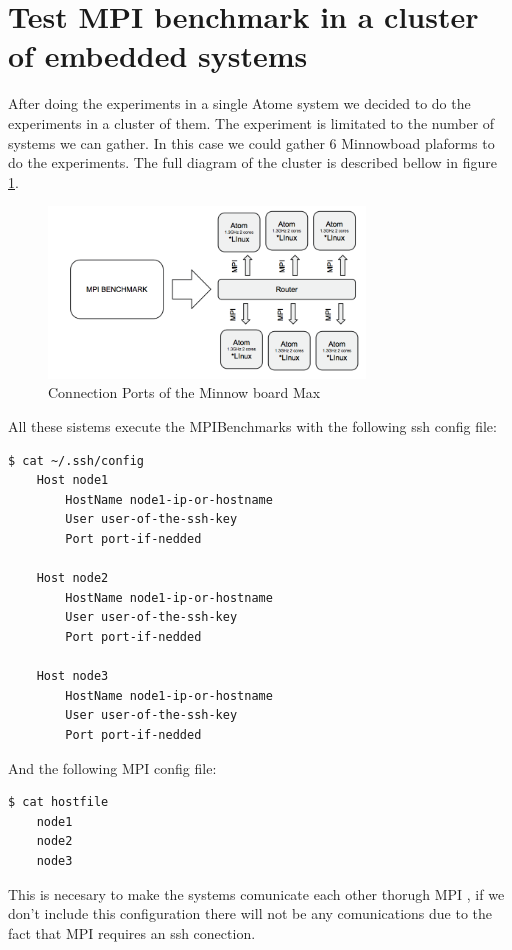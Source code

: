 \section{Test MPI benchmark in a cluster of embedded systems}

After doing the experiments in a single Atome system we decided to do the
experiments in a cluster of them. The experiment is limitated to the number of
systems we can gather. In this case we could gather 6 Minnowboad
\cite{minnowboard} plaforms to do the experiments. The full diagram of the
cluster is described bellow in figure \ref{fig:5.20}.

\begin{figure}[H]
\centering
\includegraphics[width=0.75\textwidth]{images/cluster_minnows.png}
\caption{Connection Ports of the Minnow board Max}
\label{fig:5.20}
\end{figure}

All these sistems execute the MPIBenchmarks with the following ssh config file:


\begin{lstlisting}[frame=single,language=bash]
  $ cat ~/.ssh/config
    Host node1
        HostName node1-ip-or-hostname
        User user-of-the-ssh-key
        Port port-if-nedded

    Host node2
        HostName node1-ip-or-hostname
        User user-of-the-ssh-key
        Port port-if-nedded

    Host node3
        HostName node1-ip-or-hostname
        User user-of-the-ssh-key
        Port port-if-nedded

\end{lstlisting}

And the following MPI config file:


\begin{lstlisting}[frame=single,language=bash]
  $ cat hostfile
    node1
    node2
    node3
\end{lstlisting}

This is necesary to make the systems comunicate each other thorugh MPI , if we
don't include this configuration there will not be any comunications due to the
fact that MPI requires an ssh conection. 


\clearpage
